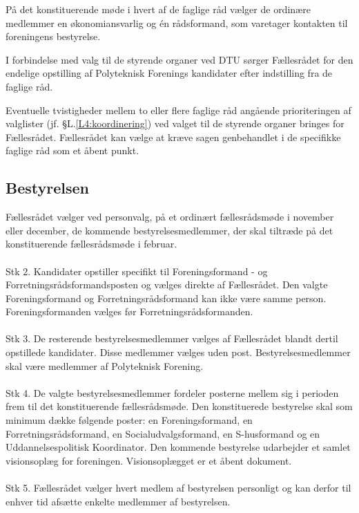 \begin{list}
\item På det konstituerende møde i hvert af de faglige råd vælger de ordinære medlemmer en økonomiansvarlig og én rådsformand, som varetager kontakten til foreningens bestyrelse.

\item I forbindelse med valg til de styrende organer ved DTU sørger Fællesrådet for den endelige opstilling af Polyteknisk Forenings kandidater efter indstilling fra de faglige råd.

\item Eventuelle tvistigheder mellem to eller flere faglige råd angående prioriteringen af valglister (jf. §L.\ref{L4:koordinering}) ved valget til de styrende organer bringes for Fællesrådet. Fællesrådet kan vælge at kræve sagen genbehandlet i de specifikke faglige råd som et åbent punkt.



\subsection{Bestyrelsen}
\label{kap:bestyrelsen}
\item \label{L:best:valg} Fællesrådet vælger ved personvalg, på et ordinært fællesrådsmøde i november eller december, de kommende bestyrelsesmedlemmer, der skal tiltræde på det konstituerende fællesrådsmøde i februar. 
\\
\\
Stk 2. Kandidater opstiller specifikt til Foreningsformand - og Forretningsrådsformandsposten og vælges direkte af Fællesrådet. Den valgte Foreningsformand og Forretningsrådsformand kan ikke være samme person. Foreningsformanden vælges før Forretningsrådsformanden.
\\
\\
Stk 3. De resterende bestyrelsesmedlemmer vælges af Fællesrådet blandt dertil opstillede kandidater. Disse medlemmer vælges uden post. Bestyrelsesmedlemmer skal være medlemmer af Polyteknisk Forening.
\\
\\
Stk 4. De valgte bestyrelsesmedlemmer fordeler posterne mellem sig i perioden frem til det konstituerende fællesrådsmøde. Den konstituerede bestyrelse skal som minimum dække følgende poster: en Foreningsformand, en Forretningsrådsformand, en Socialudvalgsformand, en S-husformand og en Uddannelsespolitisk Koordinator. Den kommende bestyrelse udarbejder et samlet visionsoplæg for foreningen. Visionsoplægget er et åbent dokument.
\\
\\
Stk 5. Fællesrådet vælger hvert medlem af bestyrelsen personligt og kan derfor til enhver tid afsætte enkelte medlemmer af bestyrelsen.


\end{list}
